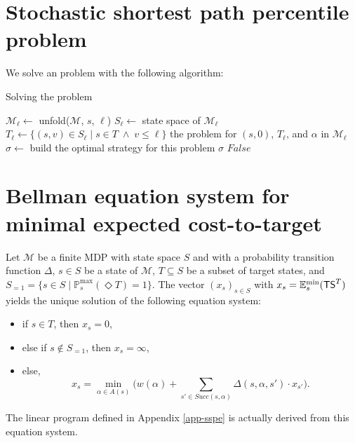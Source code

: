 \section{Stochastic shortest path percentile problem}
\label{sspp-appendix}
We solve an \SSPP{} problem \cite{DBLP:journals/corr/RandourRS14a} with the following algorithm:
\begin{algorithm}
\caption{Solving the \SSPP{} problem}
\label{sspp-algo}
\begin{algorithmic}[1]
\STATE $\mathcal{M}_\ell \leftarrow$ {\sffamily unfold($\mathcal{M}$, $s$, $\ell$)}
\STATE $S_\ell \leftarrow $ state space of $\mathcal{M}_\ell$
\STATE $T_\ell \leftarrow \{ (s, v) \in S_\ell \; | \; s \in T \; \wedge \; v \leq \ell \}$
 the \SR{} problem for $(s, 0)$, $T_\ell$, and $\alpha$ in $\mathcal{M}_\ell$
	\STATE $\sigma \leftarrow$ {\sffamily build} the optimal strategy for this \SR{} problem
	\RETURN $\sigma$
\ELSE
	\RETURN $False$
\ENDIF
\end{algorithmic}
\end{algorithm}

\section{Bellman equation system for minimal expected cost-to-target} \label{bellman2}
  Let $\mathcal{M}$ be a finite MDP with state space $S$ and with a probability transition function $\Delta$, $s \in S$ be a state of $\mathcal{M}$, $T \subseteq S$ be a subset of target states, and
	$S_{=1} = \{s \in S \; | \; \mathbb{P}^{\max}_s(\Diamond T) = 1 \}$.
	The vector $(x_s)_{s \in S}$ with $x_s = \mathbb{E}_s^{\min}(\text{\sffamily TS}^T)$ yields the unique solution of the following equation system:
  \begin{itemize}
    \item if $s \in T$, then $x_s=0$,
    \item else if $s \not \in S_{=1}$, then $x_s=\infty$,
    \item else,
    \[ x_s = \min_{\alpha \in A(s)} \big( w(\alpha) + \sum_{s' \in Succ(s, \alpha)} \Delta(s, \alpha, s') \cdot x_{s'} \big). \]
  \end{itemize}
The linear program defined in Appendix \ref{app-sspe} is actually derived from this equation system.

